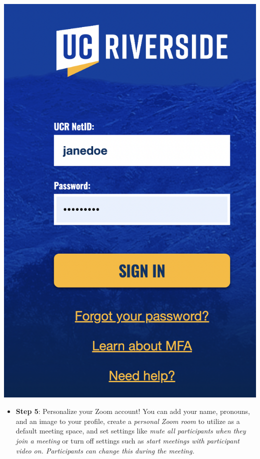 \documentclass[
]{book}
\providecommand{\tightlist}{%
  \setlength{\itemsep}{0pt}\setlength{\parskip}{0pt}}
\begin{document}
\begin{center}\includegraphics{images/zoomcred} \end{center}

\begin{itemize}
\tightlist
\item
  \textbf{Step 5}: Personalize your Zoom account! You can add your name, pronouns, and an image to your profile, create a \emph{personal Zoom room} to utilize as a default meeting space, and set settings like \emph{mute all participants when they join a meeting} or turn off settings such as \emph{start meetings with participant video on. Participants can change this during the meeting.}
\end{itemize}
\end{document}
